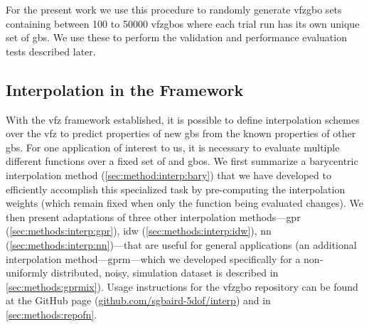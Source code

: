 \documentclass[final,twocolumn,12pt]{elsarticle}
\begin{document}
For the present work we use this procedure to randomly generate \gls{vfzgbo} sets containing between \num{100} to \num{50000} \glspl{vfzgbo} where each trial run has its own unique set of \glspl{gb}. We use these to perform the validation and performance evaluation tests described later. %
%
%
\subsection{Interpolation in the  Framework}
\label{sec:methods:interp}

With the \gls{vfz} framework established, it is possible to define interpolation schemes over the \gls{vfz} to predict properties of new \glspl{gb} from the known properties of other \glspl{gb}. For one application of interest to us, it is necessary to evaluate multiple different functions over a fixed set of \inpt{} and \outpt{} \glspl{gbo}. We first summarize a barycentric interpolation method (\cref{sec:method:interp:bary}) that we have developed to efficiently accomplish this specialized task by pre-computing the interpolation weights (which remain fixed when only the function being evaluated changes). We then present adaptations of three other interpolation methods---\gls{gpr} (\cref{sec:methods:interp:gpr}), \gls{idw} (\cref{sec:methods:interp:idw}), \gls{nn} (\cref{sec:methods:interp:nn})---that are useful for general applications (an additional interpolation method---\gls{gprm}---which we developed specifically for a non-uniformly distributed, noisy, simulation dataset is described in \cref{sec:methods:gprmix}). %
Usage instructions for the \gls{vfzgbo} repository can be found at the GitHub page (\url{github.com/sgbaird-5dof/interp}) and in \cref{sec:methods:repofn}.
%
\end{document}
